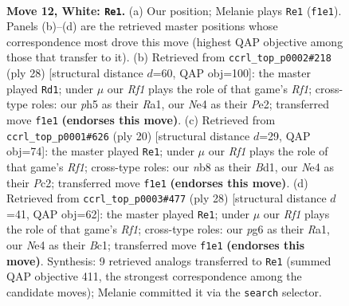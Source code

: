 \documentclass[11pt]{article}
\begin{document}
\clearpage

\begin{figure}[p]\centering
\begin{subfigure}{0.46\textwidth}\centering
\resizebox{\linewidth}{!}{%
\newchessgame
\chessboard[
  setfen={rnbr2k1/ppp2p2/6p1/4b2p/2P1N3/8/PP2BPPP/R1B2RK1 w - - 0 12},
  showmover=false,
  pgfstyle=straightmove, color=movearrow, markmove={f1-e1}
]}
\caption{}
\end{subfigure}\hfill
\begin{subfigure}{0.46\textwidth}\centering
\resizebox{\linewidth}{!}{%
\newchessgame
\chessboard[
  setfen={r1b2rk1/pp2pp1p/6p1/3B4/3b4/6P1/PP2PP1P/R1B2RK1 w - - 1 15},
  showmover=false,
  pgfstyle=straightmove, color=movearrow, markmove={f1-d1}
]}
\caption{}
\end{subfigure}
\\[4pt]
\begin{subfigure}{0.46\textwidth}\centering
\resizebox{\linewidth}{!}{%
\newchessgame
\chessboard[
  setfen={rnb2rk1/ppp2p1p/6p1/4b3/4N3/8/PPP2PPP/R1BB1RK1 w - - 0 11},
  showmover=false,
  pgfstyle=straightmove, color=movearrow, markmove={f1-e1}
]}
\caption{}
\end{subfigure}\hfill
\begin{subfigure}{0.46\textwidth}\centering
\resizebox{\linewidth}{!}{%
\newchessgame
\chessboard[
  setfen={2rk1b1r/pp2pp1p/6p1/1B1b4/8/2P5/P2P1PPP/R1B2RK1 w - - 4 15},
  showmover=false,
  pgfstyle=straightmove, color=movearrow, markmove={f1-e1}
]}
\caption{}
\end{subfigure}
\caption{\textbf{Move 12, White: \texttt{Re1}.} (a) Our position; Melanie plays \texttt{Re1} (\texttt{f1e1}). Panels (b)--(d) are the retrieved master positions whose correspondence most drove this move (highest QAP objective among those that transfer to it). (b) Retrieved from \texttt{ccrl\_top\_p0002\#218} (ply 28) [structural distance $d$=60, QAP obj=100]: the master played \texttt{Rd1}; under $\mu$ our \emph{Rf1} plays the role of that game's \emph{Rf1}; cross-type roles: our \emph{p}h5 as their \emph{R}a1, our \emph{N}e4 as their \emph{P}e2; transferred move \texttt{f1e1} \textbf{(endorses this move)}. (c) Retrieved from \texttt{ccrl\_top\_p0001\#626} (ply 20) [structural distance $d$=29, QAP obj=74]: the master played \texttt{Re1}; under $\mu$ our \emph{Rf1} plays the role of that game's \emph{Rf1}; cross-type roles: our \emph{n}b8 as their \emph{B}d1, our \emph{N}e4 as their \emph{P}c2; transferred move \texttt{f1e1} \textbf{(endorses this move)}. (d) Retrieved from \texttt{ccrl\_top\_p0003\#477} (ply 28) [structural distance $d$=41, QAP obj=62]: the master played \texttt{Re1}; under $\mu$ our \emph{Rf1} plays the role of that game's \emph{Rf1}; cross-type roles: our \emph{p}g6 as their \emph{R}a1, our \emph{N}e4 as their \emph{B}c1; transferred move \texttt{f1e1} \textbf{(endorses this move)}. Synthesis: 9 retrieved analogs transferred to \texttt{Re1} (summed QAP objective 411, the strongest correspondence among the candidate moves); Melanie committed it via the \texttt{search} selector.}
\label{fig:thought-m22}
\end{figure}
\end{document}
